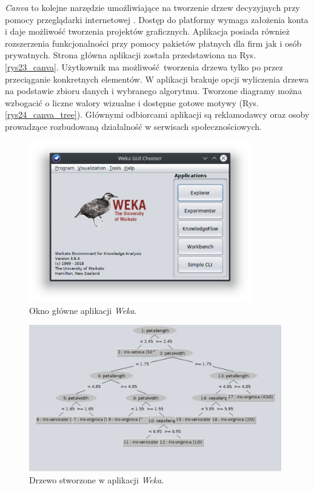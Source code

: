 \textit{Canva} to kolejne narzędzie umożliwiające na tworzenie drzew decyzyjnych przy pomocy przeglądarki internetowej \cite{misc_canva}. Dostęp do platformy wymaga założenia konta i daje możliwość tworzenia projektów graficznych. Aplikacja posiada również rozszerzenia funkcjonalności przy pomocy pakietów płatnych dla firm jak i osób prywatnych. Strona główna aplikacji została przedstawiona na Rys. \ref{rys23_canva}. Użytkownik ma możliwość tworzenia drzewa tylko po przez przeciąganie konkretnych elementów. W aplikacji brakuje opcji wyliczenia drzewa na podstawie zbioru danych i wybranego algorytmu. Tworzone diagramy można wzbogacić o liczne walory wizualne i dostępne gotowe motywy (Rys. \ref{rys24_canva_tree}). Głównymi odbiorcami aplikacji są reklamodawcy oraz osoby prowadzące rozbudowaną działalność w serwisach społecznościowych.  
 
\begin{figure}[htb]
	\centering
	\includegraphics[height=7cm]{grafika/weka.eps}
	\caption{Okno główne aplikacji \textit{Weka}.}
	\label{rys25_weka}
\end{figure}

\begin{figure}[htb]
	\centering
	\includegraphics[width=11cm]{grafika/weka_tree.eps}
	\caption{Drzewo stworzone w aplikacji \textit{Weka}.}
	\label{rys26_weka_tree}
\end{figure}

